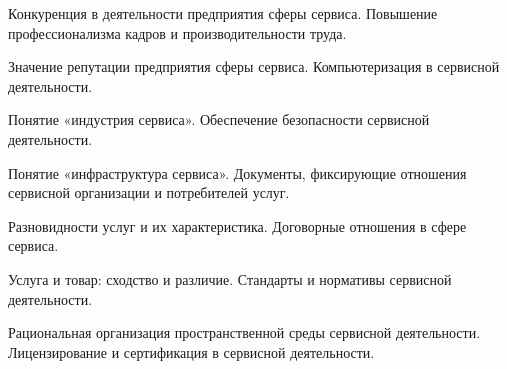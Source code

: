 \documentclass[
	14pt,
	a4paper,
	]
	{scrartcl}
\begin{document}
\vfill

\newpage


\shapk
{}
\setcounter{zad}{0}

\vfill
\z Конкуренция в деятельности предприятия сферы сервиса.
 \vfill
\z Повышение профессионализма кадров  и производительности труда. 
 \vfill

\vfill

\newpage


\shapk
{}
\setcounter{zad}{0}

\vfill
\z Значение репутации предприятия сферы сервиса.
 \vfill
\z Компьютеризация в сервисной деятельности. 
 \vfill

\vfill

\newpage


\shapk
{}
\setcounter{zad}{0}

\vfill
\z Понятие «индустрия сервиса».
 \vfill
\z Обеспечение безопасности сервисной деятельности.
 \vfill

\vfill

\newpage


\shapk
{}
\setcounter{zad}{0}

\vfill
\z Понятие «инфраструктура сервиса».
 \vfill
\z Документы, фиксирующие отношения сервисной организации и потребителей услуг.
 \vfill

\vfill

\newpage


\shapk
{}
\setcounter{zad}{0}

\vfill
\z Разновидности услуг и их характеристика.
 \vfill
\z Договорные отношения в сфере сервиса.
 \vfill

\vfill

\newpage


\shapk
{}
\setcounter{zad}{0}

\vfill
\z Услуга и товар: сходство и различие.
 \vfill
\z Стандарты и нормативы сервисной деятельности.
 \vfill

\vfill

\newpage


\shapk
{}
\setcounter{zad}{0}

\vfill
\z Рациональная организация пространственной среды сервисной деятельности.
 \vfill
\z Лицензирование и сертификация в сервисной деятельности.
 \vfill

\vfill
\end{document}
